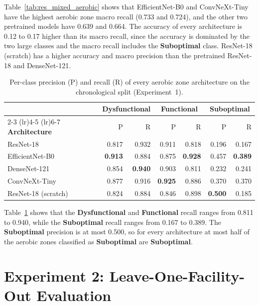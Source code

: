 Table~\ref{tab:res_mixed_aerobic} shows that EfficientNet-B0 and ConvNeXt-Tiny have the highest aerobic zone macro recall (0.733 and 0.724), and the other two pretrained models have 0.639 and 0.664. The accuracy of every architecture is 0.12 to 0.17 higher than its macro recall, since the accuracy is dominated by the two large classes and the macro recall includes the \textbf{Suboptimal} class. ResNet-18 (scratch) has a higher accuracy and macro precision than the pretrained ResNet-18 and DenseNet-121.

\begin{table}[htbp]
\centering
\setlength{\tabcolsep}{4pt}
\caption{Per-class precision (P) and recall (R) of every aerobic zone architecture on the chronological split (Experiment~1).}
\label{tab:res_mixed_aerobic_perclass}
\begin{tabular}{l rr rr rr}
\toprule
& \multicolumn{2}{c}{\textbf{Dysfunctional}} & \multicolumn{2}{c}{\textbf{Functional}} & \multicolumn{2}{c}{\textbf{Suboptimal}} \\
\cmidrule(lr){2-3} \cmidrule(lr){4-5} \cmidrule(lr){6-7}
\textbf{Architecture} & P & R & P & R & P & R \\
\midrule
ResNet-18 & 0.817 & 0.932 & 0.911 & 0.818 & 0.196 & 0.167 \\
EfficientNet-B0 & \textbf{0.913} & 0.884 & 0.875 & \textbf{0.928} & 0.457 & \textbf{0.389} \\
DenseNet-121 & 0.854 & \textbf{0.940} & 0.903 & 0.811 & 0.232 & 0.241 \\
ConvNeXt-Tiny & 0.877 & 0.916 & \textbf{0.925} & 0.886 & 0.370 & 0.370 \\
ResNet-18 (scratch) & 0.824 & 0.884 & 0.846 & 0.898 & \textbf{0.500} & 0.185 \\
\bottomrule
\end{tabular}
\end{table}

Table~\ref{tab:res_mixed_aerobic_perclass} shows that the \textbf{Dysfunctional} and \textbf{Functional} recall ranges from 0.811 to 0.940, while the \textbf{Suboptimal} recall ranges from 0.167 to 0.389. The \textbf{Suboptimal} precision is at most 0.500, so for every architecture at most half of the aerobic zones classified as \textbf{Suboptimal} are \textbf{Suboptimal}.

\FloatBarrier

\section{Experiment 2: Leave-One-Facility-Out Evaluation}
\label{appen:res_lofo}

